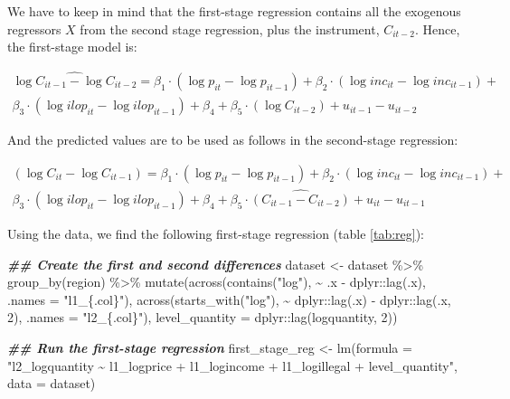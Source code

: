 \documentclass[
]{article}
\newenvironment{Shaded}{\begin{snugshade}}{\end{snugshade}}
\newcommand{\AttributeTok}[1]{\textcolor[rgb]{0.77,0.63,0.00}{#1}}
\newcommand{\DecValTok}[1]{\textcolor[rgb]{0.00,0.00,0.81}{#1}}
\newcommand{\DocumentationTok}[1]{\textcolor[rgb]{0.56,0.35,0.01}{\textbf{\textit{#1}}}}
\newcommand{\FunctionTok}[1]{\textcolor[rgb]{0.00,0.00,0.00}{#1}}
\newcommand{\NormalTok}[1]{#1}
\newcommand{\OtherTok}[1]{\textcolor[rgb]{0.56,0.35,0.01}{#1}}
\newcommand{\SpecialCharTok}[1]{\textcolor[rgb]{0.00,0.00,0.00}{#1}}
\newcommand{\StringTok}[1]{\textcolor[rgb]{0.31,0.60,0.02}{#1}}
\let\oldShaded\Shaded
\let\endoldShaded\endShaded
\renewenvironment{Shaded}{\footnotesize\oldShaded}{\endoldShaded}
\begin{document}
We have to keep in mind that the first-stage regression contains all the
exogenous regressors \(X\) from the second stage regression, plus the
instrument, \(C_{it-2}\). Hence, the first-stage model is:

\begin{align*}
\widehat{\log C_{it-1} - \log C_{it-2}} = \beta_1 \cdot (\log p_{it} - \log p_{it-1}) + \beta_2 \cdot (\log inc_{it} - \log inc_{it-1}) + \\
\beta_3 \cdot (\log ilop_{it} - \log ilop_{it-1}) + \beta_4 + \beta_5 \cdot (\log C_{it-2}) + u_{it-1} - u_{it-2}
\end{align*}

And the predicted values are to be used as follows in the second-stage
regression:

\begin{align*}
(\log C_{it} - \log C_{it-1}) = \beta_1 \cdot (\log p_{it} - \log p_{it-1}) + \beta_2 \cdot (\log inc_{it} - \log inc_{it-1}) + \\
\beta_3 \cdot (\log ilop_{it} - \log ilop_{it-1}) + \beta_4 + \beta_5 \cdot \widehat{(C_{it-1} - C_{it-2})} + u_{it} - u_{it-1}
\end{align*}

Using the data, we find the following first-stage regression (table
\ref{tab:reg}):

\begin{Shaded}
\begin{Highlighting}[]
\DocumentationTok{\#\# Create the first and second differences}
\NormalTok{dataset }\OtherTok{\textless{}{-}}\NormalTok{ dataset }\SpecialCharTok{\%\textgreater{}\%}
    \FunctionTok{group\_by}\NormalTok{(region) }\SpecialCharTok{\%\textgreater{}\%}
    \FunctionTok{mutate}\NormalTok{(}\FunctionTok{across}\NormalTok{(}\FunctionTok{contains}\NormalTok{(}\StringTok{"log"}\NormalTok{),}
                  \SpecialCharTok{\textasciitilde{}}\NormalTok{ .x }\SpecialCharTok{{-}}\NormalTok{ dplyr}\SpecialCharTok{::}\FunctionTok{lag}\NormalTok{(.x), }\AttributeTok{.names =} \StringTok{"l1\_\{.col\}"}\NormalTok{),}
           \FunctionTok{across}\NormalTok{(}\FunctionTok{starts\_with}\NormalTok{(}\StringTok{"log"}\NormalTok{),}
                  \SpecialCharTok{\textasciitilde{}}\NormalTok{ dplyr}\SpecialCharTok{::}\FunctionTok{lag}\NormalTok{(.x) }\SpecialCharTok{{-}}\NormalTok{ dplyr}\SpecialCharTok{::}\FunctionTok{lag}\NormalTok{(.x, }\DecValTok{2}\NormalTok{), }\AttributeTok{.names =} \StringTok{"l2\_\{.col\}"}\NormalTok{),}
           \AttributeTok{level\_quantity =}\NormalTok{ dplyr}\SpecialCharTok{::}\FunctionTok{lag}\NormalTok{(logquantity, }\DecValTok{2}\NormalTok{))}

\DocumentationTok{\#\# Run the first{-}stage regression}
\NormalTok{first\_stage\_reg }\OtherTok{\textless{}{-}} \FunctionTok{lm}\NormalTok{(}\AttributeTok{formula =} \StringTok{"l2\_logquantity \textasciitilde{} l1\_logprice + l1\_logincome + l1\_logillegal +}
\StringTok{   level\_quantity"}\NormalTok{,}
   \AttributeTok{data =}\NormalTok{ dataset)}
\end{Highlighting}
\end{Shaded}
\end{document}

